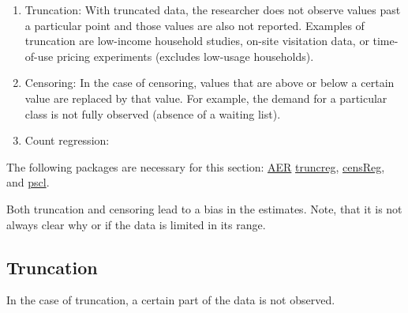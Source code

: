 \documentclass[
]{article}
\newenvironment{Shaded}{\begin{snugshade}}{\end{snugshade}}
\newcommand{\DataTypeTok}[1]{\textcolor[rgb]{0.13,0.29,0.53}{#1}}
\newcommand{\DecValTok}[1]{\textcolor[rgb]{0.00,0.00,0.81}{#1}}
\newcommand{\KeywordTok}[1]{\textcolor[rgb]{0.13,0.29,0.53}{\textbf{#1}}}
\newcommand{\NormalTok}[1]{#1}
\newcommand{\OperatorTok}[1]{\textcolor[rgb]{0.81,0.36,0.00}{\textbf{#1}}}
\newcommand{\StringTok}[1]{\textcolor[rgb]{0.31,0.60,0.02}{#1}}
\begin{document}
\begin{enumerate}
\def\labelenumi{\arabic{enumi}.}
\item
  Truncation: With truncated data, the researcher does not observe values past a particular point and those values are also not reported. Examples of truncation are low-income household studies, on-site visitation data, or time-of-use pricing experiments (excludes low-usage households).
\item
  Censoring: In the case of censoring, values that are above or below a certain value are replaced by that value. For example, the demand for a particular class is not fully observed (absence of a waiting list).
\item
  Count regression:
\end{enumerate}

The following packages are necessary for this section: \href{https://cran.r-project.org/web/packages/AER/index.html}{AER} \href{https://cran.r-project.org/web/packages/truncreg/index.html}{truncreg}, \href{https://cran.r-project.org/web/packages/censReg/index.html}{censReg}, and \href{https://cran.r-project.org/web/packages/pscl/index.html}{pscl}.

Both truncation and censoring lead to a bias in the estimates. Note, that it is not always clear why or if the data is limited in its range.

\hypertarget{truncation}{%
\subsection{Truncation}\label{truncation}}

In the case of truncation, a certain part of the data is not observed.

\begin{Shaded}
\end{Shaded}
\end{document}
